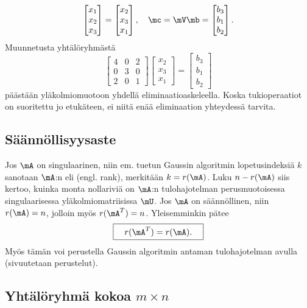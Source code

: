 \begin{Exa}
\[               \begin{bmatrix} x_1 \\ x_2 \\ x_3 \end{bmatrix}
             = \begin{bmatrix} x_2 \\ x_3 \\ x_1 \end{bmatrix}, \quad
\mc = \mV\mb = \begin{bmatrix} b_3 \\ b_1 \\ b_2 \end{bmatrix}.
\]
Muunnetusta yhtälöryhmästä
\[
\begin{bmatrix} 4&0&2\\0&3&0\\2&0&1 \end{bmatrix} 
\begin{bmatrix} x_2 \\ x_3 \\ x_1 \end{bmatrix} =
\begin{bmatrix} b_3 \\ b_1 \\ b_2 \end{bmatrix}
\]
päästään yläkolmiomuotoon yhdellä eliminaatioaskeleella. Koska tukioperaatiot on suoritettu jo
etukäteen, ei niitä enää eliminaation yhteydessä tarvita. \loppu
\end{Exa}

\subsection*{Säännöllisyysaste}

Jos $\mA$ on singulaarinen, niin em. tuetun Gaussin algoritmin lopetusindeksiä $k$ sanotaan 
$\mA$:n  eli  (engl. rank), merkitään $k=r(\mA)$. 
Luku $n-r(\mA)$ siis kertoo, kuinka monta nollariviä on $\mA$:n tulohajotelman perusmuotoisessa
singulaarisessa yläkolmiomatriisissa $\mU$. Jos $\mA$ on säännöllinen, niin $r(\mA)=n$, jolloin
myös $r(\mA^T)=n$. Yleisemminkin pätee
\[
\boxed{\quad r(\mA^T)=r(\mA). \quad}
\]
Myös tämän voi perustella Gaussin algoritmin antaman tulohajotelman avulla (sivuutetaan
perustelut).

\subsection*{Yhtälöryhmä kokoa $m \times n$}

